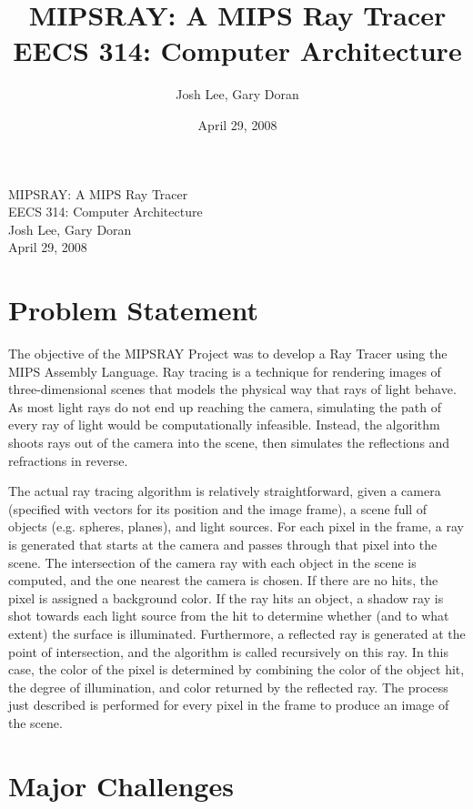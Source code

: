 \documentclass[10pt]{article}
\title{MIPSRAY: A MIPS Ray Tracer\\\Large EECS 314: Computer Architecture}
\author{Josh Lee, Gary Doran}
\date{April 29, 2008}
\begin{document}
\begin{center}
\LARGE MIPSRAY: A MIPS Ray Tracer \\
\Large EECS 314: Computer Architecture \\
\medskip
\large Josh Lee, Gary Doran \\
April 29, 2008
\end{center}

\section{Problem Statement}

The objective of the MIPSRAY Project was to develop a Ray Tracer
using the MIPS Assembly Language. Ray tracing is a technique for
rendering images of three-dimensional scenes that models the physical
way that rays of light behave. As most light rays do not end up
reaching the camera, simulating the path of every ray of light would
be computationally infeasible. Instead, the algorithm shoots rays
out of the camera into the scene, then simulates the reflections and
refractions in reverse.

The actual ray tracing algorithm is relatively straightforward, given a
camera (specified with vectors for its position and the image frame),
a scene full of objects (e.g. spheres, planes), and light sources.
For each pixel in the frame, a ray is generated that starts at the
camera and passes through that pixel into the scene. The intersection
of the camera ray with each object in the scene is computed, and the
one nearest the camera is chosen. If there are no hits, the pixel is
assigned a background color. If the ray hits an object, a shadow ray is
shot towards each light source from the hit to determine whether (and
to what extent) the surface is illuminated. Furthermore, a reflected
ray is generated at the point of intersection, and the algorithm is
called recursively on this ray. In this case, the color of the pixel
is determined by combining the color of the object hit, the degree of
illumination, and color returned by the reflected ray. The process just
described is performed for every pixel in the frame to produce an image
of the scene.

\section{Major Challenges}
\end{document}
